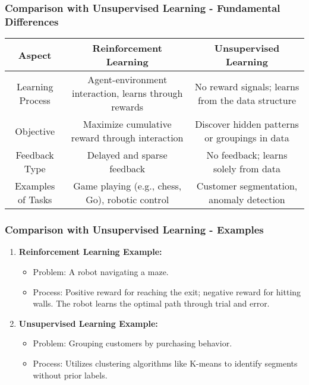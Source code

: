 \documentclass[aspectratio=169]{beamer}
\begin{document}
\begin{frame}[fragile]
    \frametitle{Comparison with Unsupervised Learning - Fundamental Differences}
    \begin{table}[ht]
        \centering
        \begin{tabular}{|c|c|c|}
        \hline
        \textbf{Aspect} & \textbf{Reinforcement Learning} & \textbf{Unsupervised Learning} \\ \hline
        Learning Process & Agent-environment interaction, learns through rewards & No reward signals; learns from the data structure \\ \hline
        Objective & Maximize cumulative reward through interaction & Discover hidden patterns or groupings in data \\ \hline
        Feedback Type & Delayed and sparse feedback & No feedback; learns solely from data \\ \hline
        Examples of Tasks & Game playing (e.g., chess, Go), robotic control & Customer segmentation, anomaly detection \\ \hline
        \end{tabular}
    \end{table}
\end{frame}

\begin{frame}[fragile]
    \frametitle{Comparison with Unsupervised Learning - Examples}
    \begin{enumerate}
        \item \textbf{Reinforcement Learning Example:}
            \begin{itemize}
                \item Problem: A robot navigating a maze.
                \item Process: Positive reward for reaching the exit; negative reward for hitting walls. The robot learns the optimal path through trial and error.
            \end{itemize}
        
        \item \textbf{Unsupervised Learning Example:}
            \begin{itemize}
                \item Problem: Grouping customers by purchasing behavior.
                \item Process: Utilizes clustering algorithms like K-means to identify segments without prior labels.
            \end{itemize}
    \end{enumerate}
\end{frame}
\end{document}

